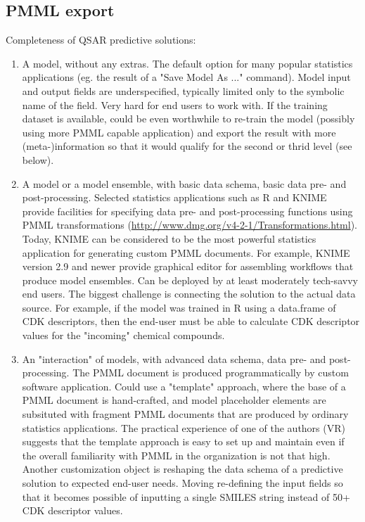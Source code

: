 \documentclass[12pt,letterpaper]{article}
\begin{document}
\subsection{PMML export}

Completeness of QSAR predictive solutions:
\begin{enumerate}
  \item A model, without any extras. The default option for many popular 
  statistics applications (eg. the result of a "Save Model As ..."
  command). Model input and output fields are underspecified, typically
  limited only to the symbolic name of the field.
  Very hard for end users to work with. If the training dataset is available,
  could be even worthwhile to re-train the model (possibly using more PMML
  capable application) and export the result with more (meta-)information so that
  it would qualify for the second or thrid level (see below). 
  \item A model or a model ensemble, with basic data schema, basic data pre- 
  and post-processing. Selected statistics applications such as R and KNIME
  provide facilities for specifying data pre- and post-processing functions
  using PMML transformations (\url{http://www.dmg.org/v4-2-1/Transformations.html}).
  Today, KNIME can be considered to be the most powerful statistics 
  application for generating custom PMML documents. For example, KNIME version
  2.9 and newer provide graphical editor for assembling workflows that produce
  model ensembles.
  Can be deployed by at least moderately tech-savvy end users. The biggest
  challenge is connecting the solution to the actual data source. For example,
  if the model was trained in R using a data.frame of CDK descriptors, then
  the end-user must be able to calculate CDK descriptor values for the
  "incoming" chemical compounds.
  \item An "interaction" of models, with advanced data schema, data pre- 
  and post-processing. The PMML document is produced programmatically by
  custom software application. Could use a "template" approach, where the base
  of a PMML document is hand-crafted, and model placeholder elements are
  subsituted with fragment PMML documents that are produced by ordinary
  statistics applications. The practical experience of one of the authors (VR)
  suggests that the template approach is easy to set up and maintain even
  if the overall familiarity with PMML in the organization is not that high.
  Another customization object is reshaping the data schema of a predictive
  solution to expected end-user needs. Moving re-defining the input fields
  so that it becomes possible of inputting a single SMILES string instead of
  50+ CDK descriptor values.
\end{enumerate}
\end{document}
